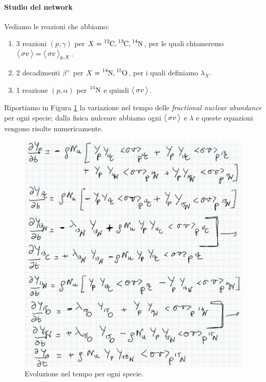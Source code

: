 \paragraph{Studio del network} 
Vediamo le reazioni che abbiamo:
\begin{enumerate}
	\item 3 reazioni $(p,\gamma)$ per $X = \ce{^{12}C},\ce{^{13}C},\ce{^{14}N}$, per le quali chiameremo $\bigl\langle\, \sigma v\, \bigr\rangle = \bigl\langle\, \sigma v\, \bigr\rangle_{p,X}$.
	\item 2 decadimenti $\beta^+$ per $X = \ce{^{14}N},\ce{^{15}O}$, per i quali definiamo $\lambda_X$.
	\item 1 reazione $(p,\alpha)$ per $\ce{^{15}N}$ e quindi $\bigl\langle\, \sigma v\, \bigr\rangle$.
\end{enumerate}
Riportiamo in Figura \ref{0422_reaz} la variazione nel tempo delle \textit{fractional nuclear abundance} per ogni specie; dalla fisica nulceare abbiamo ogni $\bigl\langle\, \sigma v\, \bigr\rangle$ e $\lambda$ e queste equazioni vengono risolte numericamente.

\begin{figure}[!h]
	\centering
	\includegraphics[scale=0.5]{Immagini/0422_reazioni.png}
	\caption{Evoluzione nel tempo per ogni specie.}
	\label{0422_reaz}
\end{figure}

